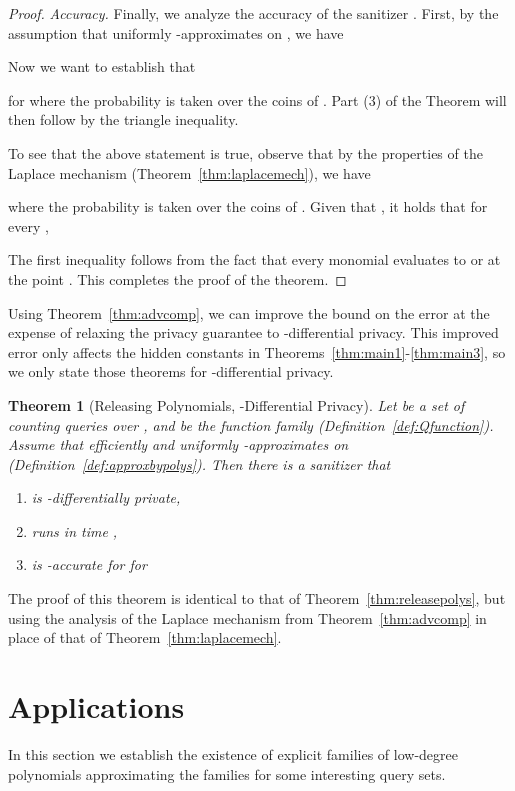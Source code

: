 \documentclass[11pt]{article}
\newtheorem{theorem}{Theorem}[section]
\theoremstyle{definition}
\begin{document}
\begin{proof}
\medskip

\noindent
\textit{Accuracy.}
Finally, we analyze the accuracy of the sanitizer .  First, by the assumption that  uniformly -approximates  on , we have
\ifnum{}

\else

\fi
Now we want to establish that 

for  where the probability is taken over the coins of .  Part (3) of the Theorem will then follow by the triangle inequality.

To see that the above statement is true, observe that by the properties of the Laplace mechanism (Theorem~\ref{thm:laplacemech}), we have

where the probability is taken over the coins of . Given that , it holds that for every ,

The first inequality follows from the fact that every monomial evaluates to  or  at the point .  This completes the proof of the theorem.

\end{proof}

Using Theorem~\ref{thm:advcomp}, we can improve the bound on the error at the expense of relaxing the privacy guarantee to -differential privacy.  This improved error only affects the hidden constants in Theorems~\ref{thm:main1}-\ref{thm:main3}, so we only state those theorems for -differential privacy.
\begin{theorem}[Releasing Polynomials, -Differential Privacy] \label{thm:advreleasepolys}
Let  be a set of counting queries over , and  be the  function family (Definition~\ref{def:Qfunction}).  Assume that  efficiently and uniformly -approximates  on  (Definition~\ref{def:approxbypolys}).  Then there is a sanitizer  that
\begin{enumerate}
\item is -differentially private,
\item runs in time ,
\item is -accurate for  for

\end{enumerate}
\end{theorem}
The proof of this theorem is identical to that of Theorem~\ref{thm:releasepolys}, but using the analysis of the Laplace mechanism from Theorem~\ref{thm:advcomp} in place of that of Theorem~\ref{thm:laplacemech}.
\section{Applications} \label{sec:apps}
In this section we establish the existence of explicit families of low-degree polynomials approximating the families  for some interesting query sets.
\end{document}
